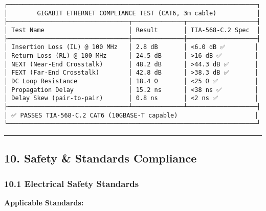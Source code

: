 \documentclass[
]{article}
\begin{document}
\begin{verbatim}
┌────────────────────────────────────────────────────────────────────┐
│        GIGABIT ETHERNET COMPLIANCE TEST (CAT6, 3m cable)           │
├─────────────────────────────────┬──────────────┬───────────────────┤
│ Test Name                       │ Result       │ TIA-568-C.2 Spec  │
├─────────────────────────────────┼──────────────┼───────────────────┤
│ Insertion Loss (IL) @ 100 MHz   │ 2.8 dB       │ <6.0 dB ✅        │
│ Return Loss (RL) @ 100 MHz      │ 24.5 dB      │ >16 dB ✅         │
│ NEXT (Near-End Crosstalk)       │ 48.2 dB      │ >44.3 dB ✅       │
│ FEXT (Far-End Crosstalk)        │ 42.8 dB      │ >38.3 dB ✅       │
│ DC Loop Resistance              │ 18.4 Ω       │ <25 Ω ✅          │
│ Propagation Delay               │ 15.2 ns      │ <38 ns ✅         │
│ Delay Skew (pair-to-pair)       │ 0.8 ns       │ <2 ns ✅          │
├─────────────────────────────────┴──────────────┴───────────────────┤
│ ✅ PASSES TIA-568-C.2 CAT6 (10GBASE-T capable)                     │
└────────────────────────────────────────────────────────────────────┘
\end{verbatim}

\begin{center}\rule{0.5\linewidth}{0.5pt}\end{center}

\hypertarget{safety-standards-compliance}{%
\subsection{10. Safety \& Standards
Compliance}\label{safety-standards-compliance}}

\hypertarget{electrical-safety-standards}{%
\subsubsection{10.1 Electrical Safety
Standards}\label{electrical-safety-standards}}

\textbf{Applicable Standards:}
\end{document}
